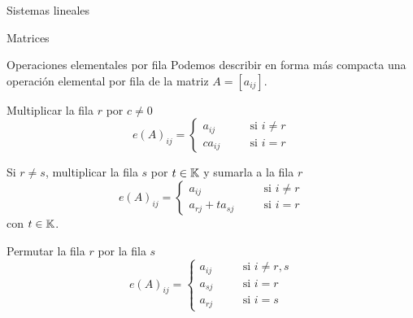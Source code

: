 \begin{chapter}{Sistemas lineales}
\begin{section}{Matrices}
\begin{subsection}{Operaciones elementales por fila}
                Podemos describir en forma más compacta una operación elemental por fila de la matriz $A=[a_{ij}]$.
                \begin{enumelem}
                    \item Multiplicar la fila $r$ por $c \not=0$
                    $$
                    e(A)_{ij} = \left\{ \begin{matrix}
                    a_{ij}& \quad &\text{si $i\not=r$} \\
                    ca_{ij}& \quad &\text{si $i=r$}
                    \end{matrix}\right.
                    $$
                    \item Si $r\not=s$, multiplicar la fila $s$ por $t \in \mathbb K$ y sumarla a la fila $r$
                    $$
                    e(A)_{ij} = \left\{ \begin{matrix}
                    a_{ij}& \quad &\text{si $i\not=r$} \\
                    a_{rj} + t a_{sj}& \quad &\text{si $i=r$}
                    \end{matrix}\right.
                    $$
                    con $t \in \mathbb K$.
                    \item Permutar la fila $r$ por la fila $s$
                    $$
                    e(A)_{ij} = \left\{ \begin{matrix}
                    a_{ij}& \quad &\text{si $i\not=r,s$}
                    \\ a_{sj}& \quad &\text{si $i=r$}
                    \\ a_{rj}& \quad &\text{si $i=s$}
                    \end{matrix}\right.
                    $$
                \end{enumelem} 
                

\end{subsection}
\end{section}
\end{chapter}

